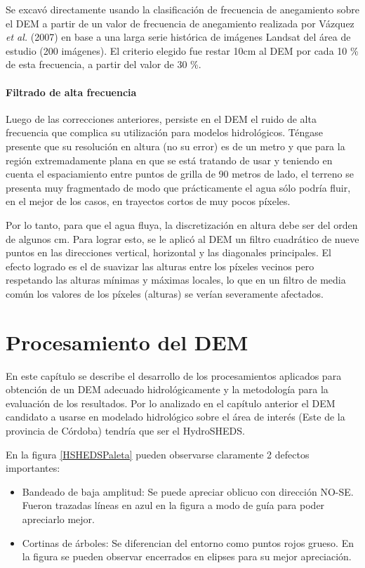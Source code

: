 \documentclass[10pt,a4paper, twoside]{report}
\begin{document}
Se excavó directamente usando la clasificación de frecuencia de anegamiento sobre el DEM a partir de un valor de frecuencia de anegamiento realizada por Vázquez \textit{et al.} (2007) en base a una larga serie histórica de imágenes Landsat del área de estudio (200 imágenes). El criterio elegido fue restar 10cm al DEM por cada 10 \% de esta frecuencia, a partir del valor de 30 \%.


\subsubsection{Filtrado de alta frecuencia}

Luego de las correcciones anteriores, persiste en el DEM el ruido de alta frecuencia que complica su utilización para modelos hidrológicos. Téngase presente que su resolución en altura (no su error) es de un metro y que para la región extremadamente plana en que se está tratando de usar y teniendo en cuenta el espaciamiento entre puntos de grilla de 90 metros de lado, el terreno se presenta muy fragmentado de modo que prácticamente el agua sólo podría fluir, en el mejor de los casos, en trayectos cortos de muy pocos píxeles.

Por lo tanto, para que el agua fluya, la discretización en altura debe ser del orden de algunos cm. Para lograr esto, se le aplicó al DEM un filtro cuadrático de nueve puntos en las direcciones vertical, horizontal y las diagonales principales. El efecto logrado es el de suavizar las alturas entre los píxeles vecinos pero respetando las alturas mínimas y máximas locales, lo que en un filtro de media común los valores de los píxeles (alturas) se verían severamente afectados.


\chapter{Procesamiento del DEM}
\label{chap:procDEM}

En este capítulo se describe el desarrollo de los procesamientos aplicados para obtención de un DEM adecuado hidrológicamente y la metodología para la evaluación de los resultados. Por lo analizado en el capítulo anterior el DEM candidato a usarse en modelado hidrológico sobre el área de interés (Este de la provincia de Córdoba) tendría que ser el HydroSHEDS.

En la figura \ref{HSHEDSPaleta} pueden observarse claramente 2 defectos importantes: 

\begin{itemize} 
	\item Bandeado de baja amplitud: Se puede apreciar oblicuo con dirección NO-SE. Fueron trazadas líneas en azul en la figura a modo de guía para poder apreciarlo mejor.
	\item Cortinas de árboles: Se diferencian del entorno como puntos rojos grueso. En la figura se pueden observar encerrados en elipses para su mejor apreciación.
\end{itemize}
\end{document}
